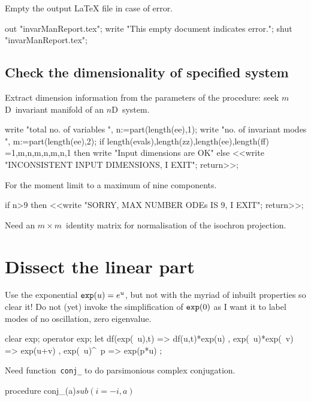 \documentclass[11pt,a5paper]{article}
\begin{document}
Empty the output LaTeX file in case of error.
\begin{reduce}
out "invarManReport.tex";
write "This empty document indicates error.";
shut "invarManReport.tex";
\end{reduce}


 


\subsection{Check the dimensionality of specified system}
Extract dimension information from the parameters of the
procedure: seek $m$D~invariant manifold of an $n$D~system.
\begin{reduce}
write "total no. of variables ",
n:=part(length(ee),1);
write "no. of invariant modes ",
m:=part(length(ee),2);
if {length(evals),length(zz),length(ee),length(ff)}
  ={{1,m},{n,m},{n,m},{n,1}} 
  then write "Input dimensions are OK" 
  else <<write "INCONSISTENT INPUT DIMENSIONS, I EXIT"; 
      return>>;
\end{reduce}

For the moment limit to a maximum of nine components.
\begin{reduce}
if n>9 then <<write "SORRY, MAX NUMBER ODEs IS 9, I EXIT"; 
    return>>;
\end{reduce}

Need an \(m\times m\)~identity matrix for normalisation of
the isochron projection.




\section{Dissect the linear part}

Use the exponential $\verb|exp|(u)=e^{u}$, but not with the
myriad of inbuilt properties so clear it! Do not (yet)
invoke the simplification of $\verb|exp|(0)$ as I want it to
label modes of no oscillation, zero eigenvalue.
\begin{reduce}
clear exp; operator exp;
let { df(exp(~u),t) => df(u,t)*exp(u)
    , exp(~u)*exp(~v) => exp(u+v)
    , exp(~u)^~p => exp(p*u)
    };
\end{reduce}

Need function~\verb|conj_| to do parsimonious complex
conjugation.   
\begin{reduce}
procedure conj_(a)$ sub(i=-i,a)$
\end{reduce}
\end{document}
